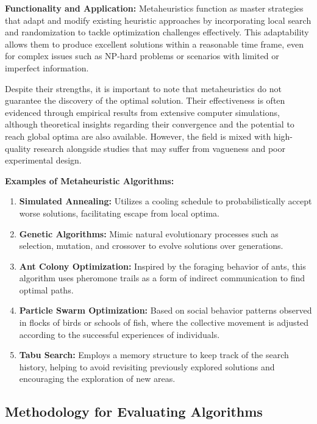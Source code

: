 \documentclass[
]{article}
\begin{document}
\textbf{Functionality and Application:}
Metaheuristics function as master strategies that adapt and modify existing heuristic approaches by incorporating local search and randomization to tackle optimization challenges effectively. This adaptability allows them to produce excellent solutions within a reasonable time frame, even for complex issues such as NP-hard problems or scenarios with limited or imperfect information.

Despite their strengths, it is important to note that metaheuristics do not guarantee the discovery of the optimal solution. Their effectiveness is often evidenced through empirical results from extensive computer simulations, although theoretical insights regarding their convergence and the potential to reach global optima are also available. However, the field is mixed with high-quality research alongside studies that may suffer from vagueness and poor experimental design.

\textbf{Examples of Metaheuristic Algorithms:}
\begin{enumerate}
  \item \textbf{Simulated Annealing:} Utilizes a cooling schedule to probabilistically accept worse solutions, facilitating escape from local optima.
  \item \textbf{Genetic Algorithms:} Mimic natural evolutionary processes such as selection, mutation, and crossover to evolve solutions over generations.
  \item \textbf{Ant Colony Optimization:} Inspired by the foraging behavior of ants, this algorithm uses pheromone trails as a form of indirect communication to find optimal paths.
  \item \textbf{Particle Swarm Optimization:} Based on social behavior patterns observed in flocks of birds or schools of fish, where the collective movement is adjusted according to the successful experiences of individuals.
  \item \textbf{Tabu Search:} Employs a memory structure to keep track of the search history, helping to avoid revisiting previously explored solutions and encouraging the exploration of new areas.
\end{enumerate}

\newpage

\hypertarget{methodology-for-evaluating-algorithms}{
\subsection{ Methodology for Evaluating Algorithms}\label{methodology-for-evaluating-algorithms}}
\end{document}
